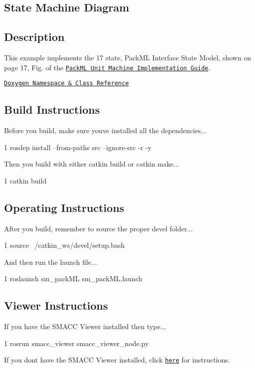 \subsection*{State Machine Diagram}



\subsection*{Description}

This example implements the 17 state, Pack\+ML Interface State Model, shown on page 17, Fig. of the \href{http://omac.org/wp-content/uploads/2016/11/PackML_Unit_Machine_Implementation_Guide-V1-00.pdf}{\tt Pack\+ML Unit Machine Implementation Guide}.~\newline


\href{https://reelrbtx.github.io/SMACC_Documentation/master/html/namespacesm__packML.html}{\tt Doxygen Namespace \& Class Reference}

\subsection*{Build Instructions}

Before you build, make sure you\textquotesingle{}ve installed all the dependencies...


\begin{DoxyCode}
1 rosdep install --from-paths src --ignore-src -r -y 
\end{DoxyCode}


Then you build with either catkin build or catkin make...


\begin{DoxyCode}
1 catkin build
\end{DoxyCode}


\subsection*{Operating Instructions}

After you build, remember to source the proper devel folder...


\begin{DoxyCode}
1 source ~/catkin\_ws/devel/setup.bash
\end{DoxyCode}


And then run the launch file...


\begin{DoxyCode}
1 roslaunch sm\_packML sm\_packML.launch
\end{DoxyCode}


\subsection*{Viewer Instructions}

If you have the S\+M\+A\+CC Viewer installed then type...


\begin{DoxyCode}
1 rosrun smacc\_viewer smacc\_viewer\_node.py
\end{DoxyCode}


If you don\textquotesingle{}t have the S\+M\+A\+CC Viewer installed, click \href{http://smacc.ninja/smacc-viewer/}{\tt here} for instructions. 